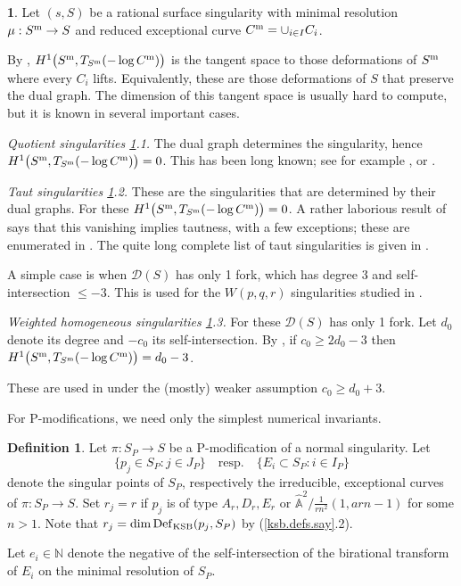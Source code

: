 \documentclass{amsart}
\theoremstyle{definition}
\newtheorem{defn}[thm]{Definition}
\newtheorem{say}[thm]{}
\theoremstyle{remark}
\newcommand{\n}[0]{{\mathbb N}}
\renewcommand{\a}[0]{\hat{\mathbb A}}
\newcommand{\qtq}[1]{\quad\mbox{#1}\quad}
\newcommand{\defsp}[0]{\operatorname{Def}}
\begin{document}
\begin{say}
  \label{taut.defn}
Let  $(s, S)$ be a rational surface singularity with  
 minimal resolution  $\mu:S^{\rm m}\to S$ and  reduced exceptional curve
$C^{\rm m}=\cup_{i\in I} C_i$.

By \cite[Sec.3.4.4]{sernesi}, $H^1\bigl(S^{\rm m}, T_{S^{\rm m}}(-\log C^{\rm m})\bigr)$
is the tangent space to those deformations of $S^{\rm m}$ where every $C_i$ lifts. Equivalently, these are  those deformations of $S$ that preserve the dual graph.  The dimension of this tangent space is usually hard to compute, but it is known in several important cases.

\medskip
{\it Quotient singularities \ref{taut.defn}.1.} The dual graph determines
the singularity, hence $H^1\bigl(S^{\rm m}, T_{S^{\rm m}}(-\log C^{\rm m})\bigr)=0$.
This has been long known; see for example \cite{briesk},
  \cite[III.5.1]{bpv} or 
  \cite[3.32]{kk-singbook}.

  \medskip
      {\it Taut singularities \ref{taut.defn}.2.} These are the singularities that are determined by their dual graphs.
      For these $H^1\bigl(S^{\rm m}, T_{S^{\rm m}}(-\log C^{\rm m})\bigr)=0$.
      A rather laborious result of \cite{MR367277, MR333238} says that
 this vanishing implies tautness,  with a few exceptions; these are enumerated in \cite[3.2]{MR333238}.
 The quite long  complete list of taut singularities is given in \cite{MR333238}.

 A simple case is when  ${\mathcal D}(S)$ has only 1 fork, which has  degree 3 and self-intersection $\leq -3$. This is  used for the  $W(p,q,r)$ singularities studied in \cite{park2022deformations}.

   \medskip
       {\it Weighted homogeneous singularities \ref{taut.defn}.3.}
       For these  ${\mathcal D}(S)$ has only 1 fork. Let $d_0$ denote its   degree  and  $-c_0$ its self-intersection.  By \cite[4.1.III]{MR333238}, if
       $c_0\geq 2d_0-3$ then
       $H^1\bigl(S^{\rm m}, T_{S^{\rm m}}(-\log C^{\rm m})\bigr)=d_0-3$.

        These are used
        in \cite{jeon2023deformations} under the (mostly) weaker assumption
        $c_0\geq d_0+3$.
\end{say}

For  P-modifications, we need only the simplest numerical 
invariants.




\begin{defn}\label{I.J.P.mod.defn}   Let  $\pi:S_P\to S$ be a
  P-modification of a normal singularity. Let
$$
\{p_j\in S_P: j\in J_P\} \qtq{resp.} \{E_i\subset S_P: i\in I_P\}
$$
 denote the singular points of $S_P$, respectively
 the irreducible, exceptional curves of $\pi:S_P\to S$.
 Set $r_j=r$ if $p_j$ is of type $A_r, D_r, E_r$  or 
 $\a^2/\tfrac1{rn^2}(1, arn{-}1)$ for some $n>1$.
Note that $r_j=\dim \defsp_{\rm KSB}(p_j,S_P)$ by (\ref{ksb.defs.say}.2).
 
Let $e_i\in \n$ denote the negative of the self-intersection of the
birational transform of $E_i$ on the minimal resolution of $S_P$.
\end{defn}
\end{document}
